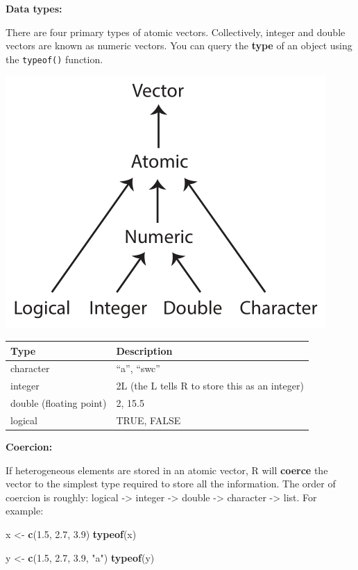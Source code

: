\documentclass[
]{book}
\newenvironment{Shaded}{\begin{snugshade}}{\end{snugshade}}
\newcommand{\FloatTok}[1]{\textcolor[rgb]{0.00,0.00,0.81}{#1}}
\newcommand{\KeywordTok}[1]{\textcolor[rgb]{0.13,0.29,0.53}{\textbf{#1}}}
\newcommand{\NormalTok}[1]{#1}
\newcommand{\StringTok}[1]{\textcolor[rgb]{0.31,0.60,0.02}{#1}}
\begin{document}
\textbf{Data types:}

There are four primary types of atomic vectors. Collectively, integer and double vectors are known as numeric vectors. You can query the \textbf{type} of an object using the \texttt{typeof()} function.

\includegraphics{R/RDataWrangling/images/summary_tree_atomic.png}

\begin{longtable}[]{@{}ll@{}}
\toprule
Type & Description\tabularnewline
\midrule
\endhead
character & ``a'', ``swc''\tabularnewline
integer & 2L (the L tells R to store this as an integer)\tabularnewline
double (floating point) & 2, 15.5\tabularnewline
logical & TRUE, FALSE\tabularnewline
\bottomrule
\end{longtable}

\textbf{Coercion:}

If heterogeneous elements are stored in an atomic vector, R will \textbf{coerce} the vector to the simplest type required to store all the information. The order of coercion is roughly: logical -\textgreater{} integer -\textgreater{} double -\textgreater{} character -\textgreater{} list. For example:

\begin{Shaded}
\begin{Highlighting}[]
\NormalTok{x <-}\StringTok{ }\KeywordTok{c}\NormalTok{(}\FloatTok{1.5}\NormalTok{, }\FloatTok{2.7}\NormalTok{, }\FloatTok{3.9}\NormalTok{)}
\KeywordTok{typeof}\NormalTok{(x)}

\NormalTok{y <-}\StringTok{ }\KeywordTok{c}\NormalTok{(}\FloatTok{1.5}\NormalTok{, }\FloatTok{2.7}\NormalTok{, }\FloatTok{3.9}\NormalTok{, }\StringTok{"a"}\NormalTok{)}
\KeywordTok{typeof}\NormalTok{(y)}
\end{Highlighting}
\end{Shaded}
\end{document}
